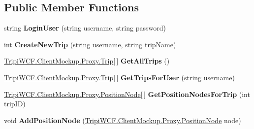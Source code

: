\subsection*{Public Member Functions}
\begin{DoxyCompactItemize}
\item 
\hypertarget{interface_tripi_w_c_f_1_1_client_mockup_1_1_proxy_1_1_i_trip_service_a446a7cca0e65b64914da8a5abb56ea9b}{
string {\bfseries LoginUser} (string username, string password)}
\label{interface_tripi_w_c_f_1_1_client_mockup_1_1_proxy_1_1_i_trip_service_a446a7cca0e65b64914da8a5abb56ea9b}

\item 
\hypertarget{interface_tripi_w_c_f_1_1_client_mockup_1_1_proxy_1_1_i_trip_service_a5f64f3357b29ee25e2ff400bd1953efb}{
int {\bfseries CreateNewTrip} (string username, string tripName)}
\label{interface_tripi_w_c_f_1_1_client_mockup_1_1_proxy_1_1_i_trip_service_a5f64f3357b29ee25e2ff400bd1953efb}

\item 
\hypertarget{interface_tripi_w_c_f_1_1_client_mockup_1_1_proxy_1_1_i_trip_service_abc1b1dc6819d30392eaf1652393fba56}{
\hyperlink{class_tripi_w_c_f_1_1_client_mockup_1_1_proxy_1_1_trip}{TripiWCF.ClientMockup.Proxy.Trip}\mbox{[}$\,$\mbox{]} {\bfseries GetAllTrips} ()}
\label{interface_tripi_w_c_f_1_1_client_mockup_1_1_proxy_1_1_i_trip_service_abc1b1dc6819d30392eaf1652393fba56}

\item 
\hypertarget{interface_tripi_w_c_f_1_1_client_mockup_1_1_proxy_1_1_i_trip_service_a73334ca5ba2410491360b8c8f32d720f}{
\hyperlink{class_tripi_w_c_f_1_1_client_mockup_1_1_proxy_1_1_trip}{TripiWCF.ClientMockup.Proxy.Trip}\mbox{[}$\,$\mbox{]} {\bfseries GetTripsForUser} (string username)}
\label{interface_tripi_w_c_f_1_1_client_mockup_1_1_proxy_1_1_i_trip_service_a73334ca5ba2410491360b8c8f32d720f}

\item 
\hypertarget{interface_tripi_w_c_f_1_1_client_mockup_1_1_proxy_1_1_i_trip_service_a94f0b89ebce82a430cac8e5867fe8406}{
\hyperlink{class_tripi_w_c_f_1_1_client_mockup_1_1_proxy_1_1_position_node}{TripiWCF.ClientMockup.Proxy.PositionNode}\mbox{[}$\,$\mbox{]} {\bfseries GetPositionNodesForTrip} (int tripID)}
\label{interface_tripi_w_c_f_1_1_client_mockup_1_1_proxy_1_1_i_trip_service_a94f0b89ebce82a430cac8e5867fe8406}

\item 
\hypertarget{interface_tripi_w_c_f_1_1_client_mockup_1_1_proxy_1_1_i_trip_service_a27741eac5f6c01d6f17f053b27bd2224}{
void {\bfseries AddPositionNode} (\hyperlink{class_tripi_w_c_f_1_1_client_mockup_1_1_proxy_1_1_position_node}{TripiWCF.ClientMockup.Proxy.PositionNode} node)}
\label{interface_tripi_w_c_f_1_1_client_mockup_1_1_proxy_1_1_i_trip_service_a27741eac5f6c01d6f17f053b27bd2224}


\end{DoxyCompactItemize}
